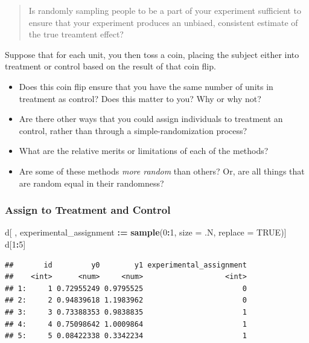 \documentclass[
]{article}
\newenvironment{Shaded}{\begin{snugshade}}{\end{snugshade}}
\newcommand{\AttributeTok}[1]{\textcolor[rgb]{0.13,0.29,0.53}{#1}}
\newcommand{\ConstantTok}[1]{\textcolor[rgb]{0.56,0.35,0.01}{#1}}
\newcommand{\DecValTok}[1]{\textcolor[rgb]{0.00,0.00,0.81}{#1}}
\newcommand{\FunctionTok}[1]{\textcolor[rgb]{0.13,0.29,0.53}{\textbf{#1}}}
\newcommand{\NormalTok}[1]{#1}
\newcommand{\SpecialCharTok}[1]{\textcolor[rgb]{0.81,0.36,0.00}{\textbf{#1}}}
\providecommand{\tightlist}{%
  \setlength{\itemsep}{0pt}\setlength{\parskip}{0pt}}
\theoremstyle{definition}
\theoremstyle{definition}
\theoremstyle{definition}
\theoremstyle{definition}
\theoremstyle{remark}
\begin{document}
\begin{quote}
Is randomly sampling people to be a part of your experiment sufficient to ensure that your experiment produces an unbiaed, consistent estimate of the true treamtent effect?
\end{quote}

Suppose that for each unit, you then toss a coin, placing the subject either into treatment or control based on the result of that coin flip.

\begin{itemize}
\tightlist
\item
  Does this coin flip ensure that you have the same number of units in treatment as control? Does this matter to you? Why or why not?
\item
  Are there other ways that you could assign individuals to treatment an control, rather than through a simple-randomization process?
\item
  What are the relative merits or limitations of each of the methods?
\item
  Are some of these methods \emph{more random} than others? Or, are all things that are random equal in their randomness?
\end{itemize}

\subsubsection{Assign to Treatment and Control}\label{assign-to-treatment-and-control}

\begin{Shaded}
\begin{Highlighting}[]
\NormalTok{d[ , experimental\_assignment }\SpecialCharTok{:=} \FunctionTok{sample}\NormalTok{(}\DecValTok{0}\SpecialCharTok{:}\DecValTok{1}\NormalTok{, }\AttributeTok{size =}\NormalTok{ .N, }\AttributeTok{replace =} \ConstantTok{TRUE}\NormalTok{)]}
\NormalTok{d[}\DecValTok{1}\SpecialCharTok{:}\DecValTok{5}\NormalTok{]}
\end{Highlighting}
\end{Shaded}

\begin{verbatim}
##       id         y0        y1 experimental_assignment
##    <int>      <num>     <num>                   <int>
## 1:     1 0.72955249 0.9795525                       0
## 2:     2 0.94839618 1.1983962                       0
## 3:     3 0.73388353 0.9838835                       1
## 4:     4 0.75098642 1.0009864                       1
## 5:     5 0.08422338 0.3342234                       1
\end{verbatim}
\end{document}
